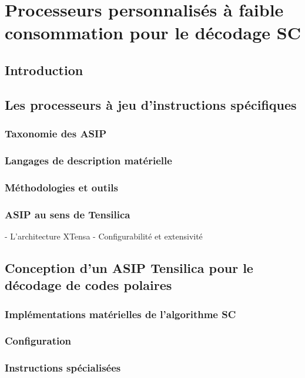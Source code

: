 \chapter{Processeurs personnalisés à faible consommation pour le décodage SC} %


\vspace*{\fill}
\minitocTITI
\vspace*{\fill}
\newpage

\section*{Introduction}

\section{Les processeurs à jeu d'instructions spécifiques}

\subsection{Taxonomie des ASIP}
\subsection{Langages de description matérielle}
\subsection{Méthodologies et outils}
\subsection{ASIP au sens de Tensilica}

- L'architecture XTensa
- Configurabilité et extensivité


\section{Conception d'un ASIP Tensilica pour le décodage de codes polaires}

\subsection{Implémentations matérielles de l'algorithme SC}
\subsection{Configuration}
\subsection{Instructions spécialisées}
